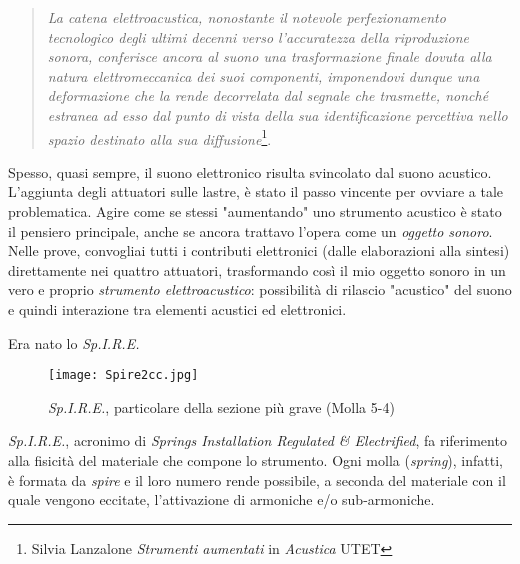 \begin{quotation}
\textit{La catena elettroacustica, nonostante il notevole perfezionamento tecnologico degli ultimi decenni verso l'accuratezza della riproduzione sonora, conferisce ancora al suono una trasformazione finale dovuta alla natura elettromeccanica dei suoi componenti, imponendovi dunque una deformazione che la rende decorrelata dal segnale che trasmette, nonché estranea ad esso dal punto di vista della sua identificazione percettiva nello spazio destinato alla sua diffusione}\footnote{Silvia Lanzalone \textit{Strumenti aumentati} in \textit{Acustica} UTET}.
\end{quotation}

Spesso, quasi sempre, il suono elettronico risulta svincolato dal suono acustico. L'aggiunta degli attuatori sulle lastre, è stato il passo vincente per ovviare a tale problematica. Agire come se stessi "aumentando" uno strumento acustico è stato il pensiero principale, anche se ancora trattavo l'opera come un \textit{oggetto sonoro}. Nelle prove, convogliai tutti i contributi elettronici (dalle elaborazioni alla sintesi) direttamente nei quattro attuatori,  trasformando così il mio oggetto sonoro in un vero e proprio \textit{strumento elettroacustico}: possibilità di rilascio "acustico" del suono e quindi interazione tra elementi acustici ed elettronici. 

Era nato lo \textit{Sp.I.R.E.}


\begin{figure}[htbp]
\begin{center}
\texttt{[image: Spire2cc.jpg]}
\caption{\textit{Sp.I.R.E.}, particolare della sezione più grave (Molla 5-4)}
\label{default}
\end{center}
\end{figure}

\textit{Sp.I.R.E.}, acronimo di \textit{Springs Installation Regulated \& Electrified}, fa riferimento alla fisicità del materiale che compone lo strumento. Ogni molla (\textit{spring}), infatti, è formata da \textit{spire} e il loro numero rende possibile, a seconda del materiale con il quale vengono eccitate, l'attivazione di armoniche e/o sub-armoniche.


